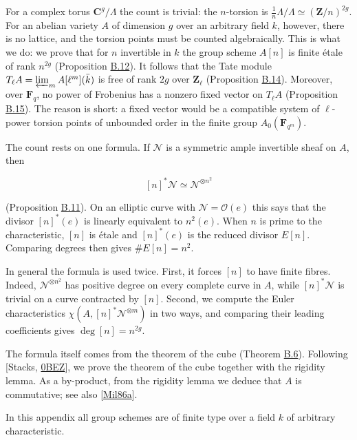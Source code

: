 \documentclass[11pt]{article}
\begin{document}
For a complex torus \(\mathbf C^g/\Lambda\) the count is trivial: the \(n\)-torsion is \(\tfrac1n\Lambda/\Lambda\simeq(\mathbf Z/n)^{2g}\). For an abelian variety \(A\) of dimension \(g\) over an arbitrary field \(k\), however, there is no lattice, and the torsion points must be counted algebraically. This is what we do: we prove that for \(n\) invertible in \(k\) the group scheme \(A[n]\) is finite étale of rank \(n^{2g}\) (Proposition \hyperref[bp108]{B.12}). It follows that the Tate module \(T_\ell A=\varprojlim_mA[\ell^m](\bar k)\) is free of rank \(2g\) over \(\mathbf Z_\ell\) (Proposition \hyperref[bp114]{B.14}). Moreover, over \(\mathbf F_q\), no power of Frobenius has a nonzero fixed vector on \(T_\ell A\) (Proposition \hyperref[bp117]{B.15}). The reason is short: a fixed vector would be a compatible system of \(\ell\)-power torsion points of unbounded order in the finite group \(A_0(\mathbf F_{q^m})\).

The count rests on one formula. If \(\mathcal N\) is a symmetric ample invertible sheaf on \(A\), then

\[
[n]^*\mathcal N\simeq\mathcal N^{\otimes n^2}
\]

(Proposition \hyperref[bp105]{B.11}). On an elliptic curve with \(\mathcal N=\mathcal O(e)\) this says that the divisor \([n]^*(e)\) is linearly equivalent to \(n^2(e)\). When \(n\) is prime to the characteristic, \([n]\) is étale and \([n]^*(e)\) is the reduced divisor \(E[n]\). Comparing degrees then gives \(\#E[n]=n^2\).

In general the formula is used twice. First, it forces \([n]\) to have finite fibres. Indeed, \(\mathcal N^{\otimes n^2}\) has positive degree on every complete curve in \(A\), while \([n]^*\mathcal N\) is trivial on a curve contracted by \([n]\). Second, we compute the Euler characteristics \(\chi(A,[n]^*\mathcal N^{\otimes m})\) in two ways, and comparing their leading coefficients gives \(\deg[n]=n^{2g}\).

The formula itself comes from the theorem of the cube (Theorem \hyperref[bp91]{B.6}). Following [Stacks, \href{https://stacks.math.columbia.edu/tag/0BEZ}{0BEZ}], we prove the theorem of the cube together with the rigidity lemma. As a by-product, from the rigidity lemma we deduce that \(A\) is commutative; see also [\hyperref[bp351]{Mil86a}].

In this appendix all group schemes are of finite type over a field \(k\) of arbitrary characteristic.

\end{document}
